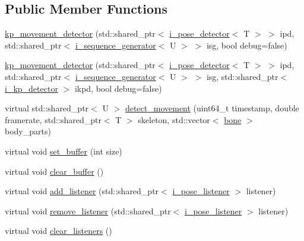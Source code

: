 \subsection*{Public Member Functions}
\begin{DoxyCompactItemize}
\item 
\hyperlink{classmae_1_1kp__movement__detector_a895e056f1ce3653b3ed71aec98b17941}{kp\-\_\-movement\-\_\-detector} (std\-::shared\-\_\-ptr$<$ \hyperlink{classmae_1_1i__pose__detector}{i\-\_\-pose\-\_\-detector}$<$ T $>$ $>$ ipd, std\-::shared\-\_\-ptr$<$ \hyperlink{classmae_1_1i__sequence__generator}{i\-\_\-sequence\-\_\-generator}$<$ U $>$ $>$ isg, bool debug=false)
\item 
\hyperlink{classmae_1_1kp__movement__detector_af9f13d86055607188453c57721d6227a}{kp\-\_\-movement\-\_\-detector} (std\-::shared\-\_\-ptr$<$ \hyperlink{classmae_1_1i__pose__detector}{i\-\_\-pose\-\_\-detector}$<$ T $>$ $>$ ipd, std\-::shared\-\_\-ptr$<$ \hyperlink{classmae_1_1i__sequence__generator}{i\-\_\-sequence\-\_\-generator}$<$ U $>$ $>$ isg, std\-::shared\-\_\-ptr$<$ \hyperlink{classmae_1_1i__kp__detector}{i\-\_\-kp\-\_\-detector} $>$ ikpd, bool debug=false)
\item 
virtual std\-::shared\-\_\-ptr$<$ U $>$ \hyperlink{classmae_1_1kp__movement__detector_a05c206df200417ea7680eb9d8a5cb6b0}{detect\-\_\-movement} (uint64\-\_\-t timestamp, double framerate, std\-::shared\-\_\-ptr$<$ T $>$ skeleton, std\-::vector$<$ \hyperlink{classmae_1_1bone}{bone} $>$ body\-\_\-parts)
\item 
virtual void \hyperlink{classmae_1_1kp__movement__detector_a673ed3ff4f7a5cd8a02cdbe254a4508e}{set\-\_\-buffer} (int size)
\item 
virtual void \hyperlink{classmae_1_1kp__movement__detector_a8fec5ae9e1f209fdcbeba3f86b5c3059}{clear\-\_\-buffer} ()
\item 
virtual void \hyperlink{classmae_1_1kp__movement__detector_a53f506b2d9c5bb759908a125af33f97d}{add\-\_\-listener} (std\-::shared\-\_\-ptr$<$ \hyperlink{classmae_1_1i__pose__listener}{i\-\_\-pose\-\_\-listener} $>$ listener)
\item 
virtual void \hyperlink{classmae_1_1kp__movement__detector_a6c93647920874e88c5b6293617cfdca2}{remove\-\_\-listener} (std\-::shared\-\_\-ptr$<$ \hyperlink{classmae_1_1i__pose__listener}{i\-\_\-pose\-\_\-listener} $>$ listener)
\item 
virtual void \hyperlink{classmae_1_1kp__movement__detector_a5333495e30be2b0d6205cd8266d2156d}{clear\-\_\-listeners} ()
\item 

\end{DoxyCompactItemize}
